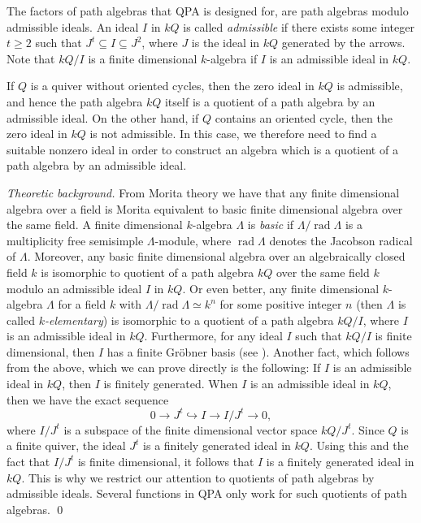\documentclass{amsart}
\newcommand{\rad}{\operatorname{rad}\nolimits}
\renewcommand{\L}{\Lambda}
\theoremstyle{definition}
\theoremstyle{theoretic}
\newenvironment{theoback}
{\medskip\footnotesize\textit{Theoretic background.} }
{\qed\par\medskip}
\begin{document}
The factors of path algebras that QPA is designed for, are path
algebras modulo admissible ideals.  An ideal $I$ in $kQ$ is called
\emph{admissible} if there exists some integer $t\geqslant 2$ such
that $J^t\subseteq I \subseteq J^2$, where $J$ is the ideal in $kQ$
generated by the arrows.  Note that $kQ/I$ is a finite dimensional
$k$-algebra if $I$ is an admissible ideal in $kQ$.

If $Q$ is a quiver without oriented cycles, then the zero ideal in
$kQ$ is admissible, and hence the path algebra $kQ$ itself is a
quotient of a path algebra by an admissible ideal.  On the other hand,
if $Q$ contains an oriented cycle, then the zero ideal in $kQ$ is not
admissible.  In this case, we therefore need to find a suitable
nonzero ideal in order to construct an algebra which is a quotient of
a path algebra by an admissible ideal.

\begin{theoback}
From Morita theory we have that
any finite dimensional algebra over a field is Morita equivalent to
basic finite dimensional algebra over the same field.  A finite
dimensional $k$-algebra $\L$ is \emph{basic} if $\L/\rad \L$ is a
multiplicity free semisimple $\L$-module, where $\rad \L$ denotes the
Jacobson radical of $\L$.  Moreover, any basic finite dimensional
algebra over an algebraically closed field $k$ is isomorphic to
quotient of a path algebra $kQ$ over the same field $k$ modulo an
admissible ideal $I$ in $kQ$.  Or even better, any finite dimensional
$k$-algebra $\L$ for a field $k$ with $\L/\rad\L\simeq k^n$ for some
positive integer $n$ (then $\L$ is called \emph{$k$-elementary}) is
isomorphic to a quotient of a path algebra $kQ/I$, where $I$ is an
admissible ideal in $kQ$.  Furthermore, for any ideal $I$ such that
$kQ/I$ is finite dimensional, then $I$ has a finite Gr\"obner basis
(see \cite{Green}).  Another fact, which follows from the above, which
we can prove directly is the following:  If $I$ is an admissible ideal
in $kQ$, then $I$ is finitely generated.  When $I$ is an admissible
ideal in $kQ$, then we have the exact sequence
\[0\to J^t\hookrightarrow I\to I/J^t\to 0,\] where $I/J^t$ is a
subspace of the finite dimensional vector space $kQ/J^t$.  Since $Q$
is a finite quiver, the ideal $J^t$ is a finitely generated ideal in
$kQ$.  Using this and the fact that $I/J^t$ is finite dimensional, it
follows that $I$ is a finitely generated ideal in $kQ$.  This is why
we restrict our attention to quotients of path algebras by admissible
ideals.  Several functions in QPA only work for such quotients of path
algebras.
\end{theoback}
\end{document}
